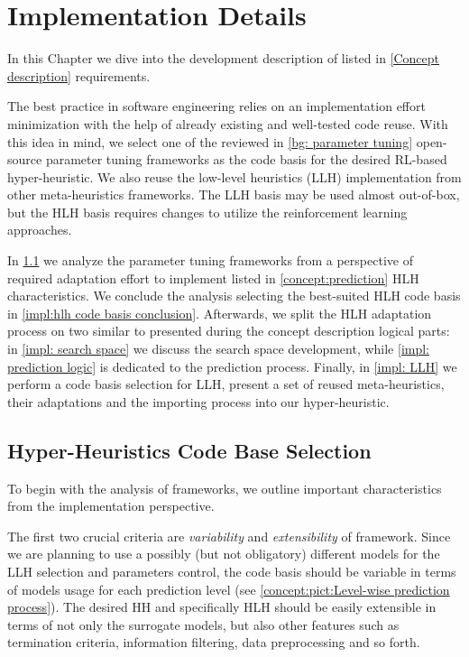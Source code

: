 \chapter{Implementation Details}\label{impl}
In this Chapter we dive into the development description of listed in \cref{Concept description} requirements.
 
The best practice in software engineering relies on an implementation effort minimization with the help of already existing and well-tested code reuse. With this idea in mind, we select one of the reviewed in \cref{bg: parameter tuning} open-source parameter tuning frameworks as the code basis for the desired RL-based hyper-heuristic. We also reuse the low-level heuristics (LLH) implementation from other meta-heuristics frameworks. The LLH basis may be used almost out-of-box, but the HLH basis requires changes to utilize the reinforcement learning approaches.

In \cref{impl:hlh code basis section} we analyze the parameter tuning frameworks from a perspective of required adaptation effort to implement listed in \cref{concept:prediction} HLH characteristics. We conclude the analysis selecting the best-suited HLH code basis in \cref{impl:hlh code basis conclusion}. Afterwards, we split the HLH adaptation process on two similar to presented during the concept description logical parts: in \cref{impl: search space} we discuss the search space development, while \cref{impl: prediction logic} is dedicated to the prediction process. Finally, in \cref{impl: LLH} we perform a code basis selection for LLH, present a set of reused meta-heuristics, their adaptations and the importing process into our hyper-heuristic.


\section{Hyper-Heuristics Code Base Selection}\label{impl:hlh code basis section}
To begin with the analysis of frameworks, we outline important characteristics from the implementation perspective.

The first two crucial criteria are \emph{variability} and \emph{extensibility} of framework. Since we are planning to use a possibly (but not obligatory) different models for the LLH selection and parameters control, the code basis should be variable in terms of models usage for each prediction level (see \cref{concept:pict:Level-wise prediction process}). The desired HH and specifically HLH should be easily extensible in terms of not only the surrogate models, but also other features such as termination criteria, information filtering, data preprocessing and so forth.

